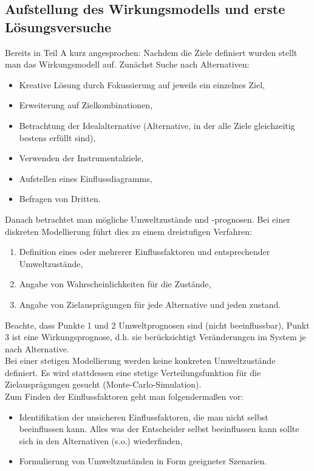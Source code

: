 \subsection{Aufstellung des Wirkungsmodells und erste Lösungsversuche}
Bereits in Teil A kurz angesprochen: Nachdem die Ziele definiert wurden stellt man das Wirkungsmodell auf. Zunächst Suche nach Alternativen:
\begin{itemize}
	\item Kreative Lösung durch Fokussierung auf jeweils ein einzelnes Ziel,
	\item Erweiterung auf Zielkombinationen,
	\item Betrachtung der Idealalternative (Alternative, in der alle Ziele gleichzeitig bestens erfüllt sind),
	\item Verwenden der Instrumentalziele,
	\item Aufstellen eines Einflussdiagramms,
	\item Befragen von Dritten.
\end{itemize}
Danach betrachtet man mögliche Umweltzustände und -prognosen. Bei einer diskreten Modellierung führt dies zu einem dreistufigen Verfahren:
\begin{enumerate}
	\item Definition eines oder mehrerer Einflussfaktoren und entsprechender Umweltzustände,
	\item Angabe von Wahrscheinlichkeiten für die Zustände,
	\item Angabe von Zielausprägungen für jede Alternative und jeden zustand.
\end{enumerate}
Beachte, dass Punkte 1 und 2 Umweltprognosen sind (nicht beeinflussbar), Punkt 3 ist eine Wirkungsprognose, d.h. sie berücksichtigt Veränderungen im System je nach Alternative.\\
Bei einer stetigen Modellierung werden keine konkreten Umweltzustände definiert. Es wird stattdessen eine stetige Verteilungsfunktion für die Zielausprägungen gesucht (Monte-Carlo-Simulation).\\
Zum Finden der Einflussfaktoren geht man folgendermaßen vor:
\begin{itemize}
	\item Identifikation der unsicheren Einflussfaktoren, die man nicht selbst beeinflussen kann. Alles was der Entscheider selbst beeinflussen kann sollte sich in den Alternativen (s.o.) wiederfinden,
	\item Formulierung von Umweltzuständen in Form geeigneter Szenarien.
\end{itemize}
